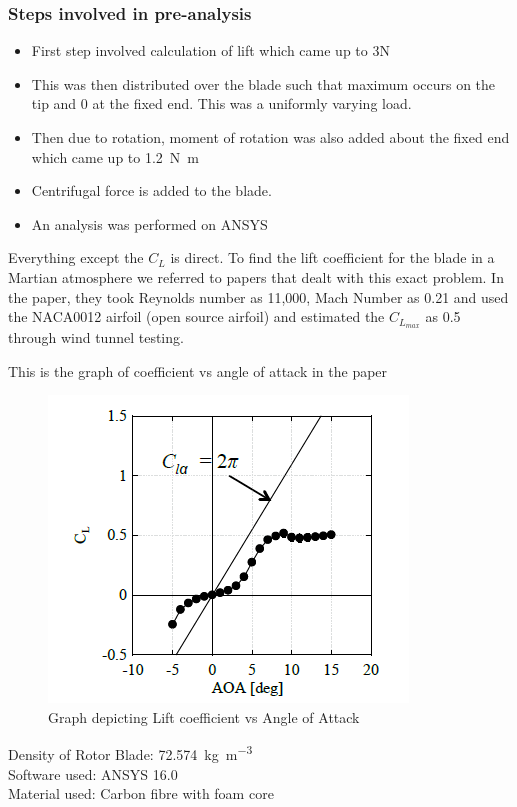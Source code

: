\documentclass[preprint,12pt]{elsarticle}
\begin{document}
\subsubsection{\textbf{Steps involved in pre-analysis}}
\begin{itemize}
    \item First step involved calculation of lift which came up to 3N
    \item This was then distributed over the blade such that maximum occurs on the tip and 0 at the fixed end. This was a uniformly varying load.
    \item Then due to rotation, moment of rotation was also added about the fixed end which came up to \SI{1.2}{\newton\metre}
    \item Centrifugal force is added to the blade. 
    \item An analysis was performed on ANSYS
\end{itemize}
Everything except the $C_L$ is direct. To find the lift coefficient for the blade in a Martian atmosphere we referred to papers that dealt with this exact problem.
In the paper, they took Reynolds number as 11,000, Mach Number as 0.21 and used the NACA0012 airfoil (open source airfoil) and estimated the $C_{L_{max}}$ as 0.5 through wind tunnel testing.

This is the graph of coefficient vs angle of attack in the paper
\begin{figure}[H]
\centering\includegraphics[width=0.69\linewidth]{graph of coefficient.png}
\caption{Graph depicting Lift coefficient vs Angle of Attack}
\end{figure}
Density of Rotor Blade: \SI{72.574}{\kilogram\per\metre\cubed}\\
Software used: ANSYS 16.0\\
Material used: Carbon fibre with foam core\\
\end{document}
